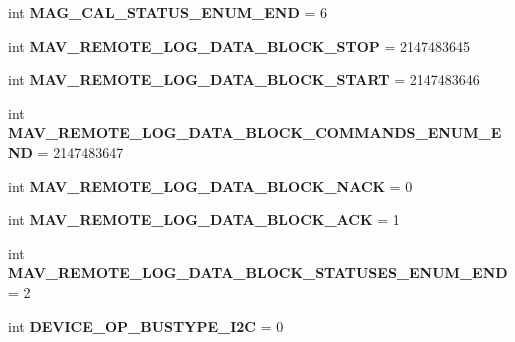 \begin{DoxyCompactItemize}
int {\bfseries M\+A\+G\+\_\+\+C\+A\+L\+\_\+\+S\+T\+A\+T\+U\+S\+\_\+\+E\+N\+U\+M\+\_\+\+E\+ND} = 6
\item 
\mbox{\label{namespacepymavlink_1_1dialects_1_1v10_a8f394e7c7d38b551348b2e9a1582bed8}} 
int {\bfseries M\+A\+V\+\_\+\+R\+E\+M\+O\+T\+E\+\_\+\+L\+O\+G\+\_\+\+D\+A\+T\+A\+\_\+\+B\+L\+O\+C\+K\+\_\+\+S\+T\+OP} = 2147483645
\item 
\mbox{\label{namespacepymavlink_1_1dialects_1_1v10_ad69d9cdd424020f889078a9121ad05b2}} 
int {\bfseries M\+A\+V\+\_\+\+R\+E\+M\+O\+T\+E\+\_\+\+L\+O\+G\+\_\+\+D\+A\+T\+A\+\_\+\+B\+L\+O\+C\+K\+\_\+\+S\+T\+A\+RT} = 2147483646
\item 
\mbox{\label{namespacepymavlink_1_1dialects_1_1v10_ae20147b5d0ae456026175166d486e478}} 
int {\bfseries M\+A\+V\+\_\+\+R\+E\+M\+O\+T\+E\+\_\+\+L\+O\+G\+\_\+\+D\+A\+T\+A\+\_\+\+B\+L\+O\+C\+K\+\_\+\+C\+O\+M\+M\+A\+N\+D\+S\+\_\+\+E\+N\+U\+M\+\_\+\+E\+ND} = 2147483647
\item 
\mbox{\label{namespacepymavlink_1_1dialects_1_1v10_af7338bddc561e4d319128d9cc91af895}} 
int {\bfseries M\+A\+V\+\_\+\+R\+E\+M\+O\+T\+E\+\_\+\+L\+O\+G\+\_\+\+D\+A\+T\+A\+\_\+\+B\+L\+O\+C\+K\+\_\+\+N\+A\+CK} = 0
\item 
\mbox{\label{namespacepymavlink_1_1dialects_1_1v10_ae56dbd4eae351addf5463b2975dd22ad}} 
int {\bfseries M\+A\+V\+\_\+\+R\+E\+M\+O\+T\+E\+\_\+\+L\+O\+G\+\_\+\+D\+A\+T\+A\+\_\+\+B\+L\+O\+C\+K\+\_\+\+A\+CK} = 1
\item 
\mbox{\label{namespacepymavlink_1_1dialects_1_1v10_aab54ca24be2af67a2fd6d81ad09f16dc}} 
int {\bfseries M\+A\+V\+\_\+\+R\+E\+M\+O\+T\+E\+\_\+\+L\+O\+G\+\_\+\+D\+A\+T\+A\+\_\+\+B\+L\+O\+C\+K\+\_\+\+S\+T\+A\+T\+U\+S\+E\+S\+\_\+\+E\+N\+U\+M\+\_\+\+E\+ND} = 2
\item 
\mbox{\label{namespacepymavlink_1_1dialects_1_1v10_a89fc1d1fccb370b8cb5e4416bb0ed6d1}} 
int {\bfseries D\+E\+V\+I\+C\+E\+\_\+\+O\+P\+\_\+\+B\+U\+S\+T\+Y\+P\+E\+\_\+\+I2C} = 0
\item 

\end{DoxyCompactItemize}
